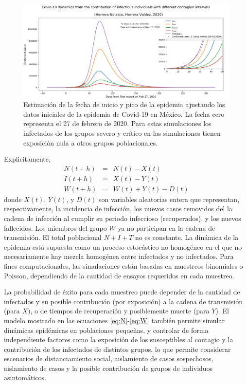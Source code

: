 \begin{figure}[h] 
\includegraphics[width=\textwidth]{figures/Covid19_Mexico_InitialFit_Herrera-Valdez+Herrera-Nolasco_2020}
\caption{Estimación de la fecha de inicio y pico de la epidemia ajustando los datos iniciales de la epidemia de Covid-19 en México. La fecha cero representa el 27 de febrero de 2020. Para estas simulaciones los infectados de los grupos severo y crítico en las simulaciones tienen exposición nula a otros grupos poblacionales. } \label{fig:inicioPicoNIW}
\end{figure}




Explicitamente,
\begin{eqnarray}
N(t+h) &=& N(t) - X(t)
 \label{eq:N} \\
I(t+h) &=& X(t) - Y(t)
\label{eq:I}\\
W(t+h) &=& W(t) + Y(t) - D(t)
\label{eq:W}
\end{eqnarray}
donde $X(t)$, $Y(t)$, y $D(t)$ son variables aleatorias entera que representan, respectivamente, la incidencia de infección, los nuevos casos removidos del la cadena de infección al cumplir su periodo infeccioso (recuperados), y los nuevos fallecidos. Los miembros del grupo $W$ ya no participan en la cadena de transmisión. El total poblacional $N+I+T$ no es constante. La dinámica de la epidemia está supuesta como un proceso estocástico no homogéneo en el que no necesariamente hay mezcla homogénea entre infectados y no infectados. Para fines computacionales, las simulaciones están basadas en muestreos binomiales o Poisson, dependiendo de la cantidad de ensayos requeridos en cada muestreo. 

 La probabilidad de éxito para cada muestreo puede depender de la cantidad de infectados y su posible contribución (por exposición) a la cadena de transmisión (para $X$), o de tiempos de recuperación y posiblemente muerte (para $Y$). El modelo mostrado en las ecuaciones \eqref{eq:N}-\eqref{eq:W} también permite simular dinámicas epidémicas en poblaciones pequeñas, y controlar de forma independiente  factores como la exposición de los susceptibles al contagio y la contribución de los infectados de distintos grupos, lo que permite considerar escenarios de distanciamiento social, aislamiento de casos sospechosos, aislamiento de casos y la posible contribución de grupos de individuos asintomáticos. 


